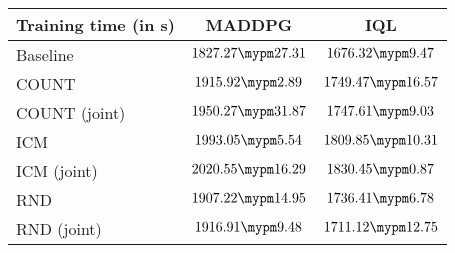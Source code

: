\begin{tabular}{l | c c}
	Training time (in s) & MADDPG & IQL\\ \toprule
		Baseline & $1827.27 \mypm 27.31$ & $1676.32 \mypm 9.47$ \\ \midrule
	COUNT & $1915.92 \mypm 2.89$ & $1749.47 \mypm 16.57$ \\
	COUNT (joint) & $1950.27 \mypm 31.87$ & $1747.61 \mypm 9.03$ \\\midrule
	ICM & $1993.05 \mypm 5.54$ & $1809.85 \mypm 10.31$ \\
	ICM (joint) & $2020.55 \mypm 16.29$ & $1830.45 \mypm 0.87$ \\\midrule
	RND & $1907.22 \mypm 14.95$ & $1736.41 \mypm 6.78$ \\
	RND (joint) & $1916.91 \mypm 9.48$ & $1711.12 \mypm 12.75$ \\\midrule
\end{tabular}
